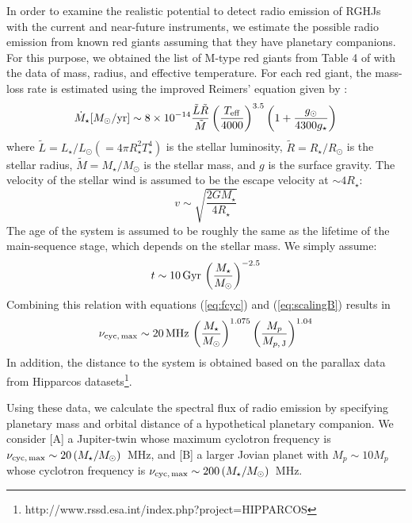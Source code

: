 \documentclass[iop,numberedappendix,apj]{emulateapj}
\begin{document}
In order to examine the realistic potential to detect radio emission of RGHJs with the current and near-future instruments, we estimate the possible radio emission from known red giants assuming that they have planetary companions. 
For this purpose, we obtained the list of M-type red giants from Table 4 of \citet{dumm1998} with the data of mass, radius, and effective temperature.
For each red giant, the mass-loss rate is estimated using the improved Reimers' equation \citep{reimers1975} given by \citet{schroder2005,schroder2007}:
\begin{equation}
\dot M_\star [M_\odot{\rm /yr}] \sim 8 \times 10^{-14} \frac{\tilde L \tilde R}{\tilde M} \left( \frac{T_{\rm eff}}{4000} \right)^{3.5} \left( 1 + \frac{g_{\odot }}{4300 g_{\star}} \right) \label{eq:mass-loss}
\end{equation}
where $\tilde L = L_{\star }/L_{\odot }(=4\pi R_{\star }^2 T_{\star }^4)$ is the stellar luminosity, $\tilde R = R_{\star }/R_{\odot }$ is the stellar radius, $\tilde M = M_{\star }/M_{\odot }$ is the stellar mass, and $g$ is the surface gravity. 
The velocity of the stellar wind is assumed to be the escape velocity at $\sim 4 R_{\star }$:
\begin{equation}
v \sim \sqrt{\frac{2GM_\star}{4R_{\star }}}
\end{equation}
The age of the system is assumed to be roughly the same as the lifetime of the main-sequence stage, which depends on the stellar mass. We simply assume:
\begin{equation}
t \sim 10\,{\rm Gyr}\, \left( \frac{M_{\star}}{M_{\odot }} \right)^{-2.5}
\end{equation}
Combining this relation with equations (\ref{eq:fcyc}) and (\ref{eq:scalingB}) results in
\begin{equation}
\nu_{\rm cyc,\,max} \sim 20 \,{\rm MHz}\, \left( \frac{M_{\star}}{M_{\odot }} \right)^{1.075} \left( \frac{M_p}{M_{p,\,{\rm J}}} \right)^{1.04} 
\end{equation}
In addition, the distance to the system is obtained based on the parallax data from Hipparcos datasets\footnote{http://www.rssd.esa.int/index.php?project=HIPPARCOS}.

Using these data, we calculate the spectral flux of radio emission by specifying planetary mass and orbital distance of a hypothetical planetary companion. 
We consider [A] a Jupiter-twin whose maximum cyclotron frequency is $\nu _{\rm cyc,\,max} \sim 20\,(M_{\star }/M_{\odot})$~MHz, and [B] a larger Jovian planet with $M_p\sim 10M_p$ whose cyclotron frequency is $\nu _{\rm cyc,\,max} \sim 200\,(M_{\star }/M_{\odot})$~MHz. 
\end{document}
